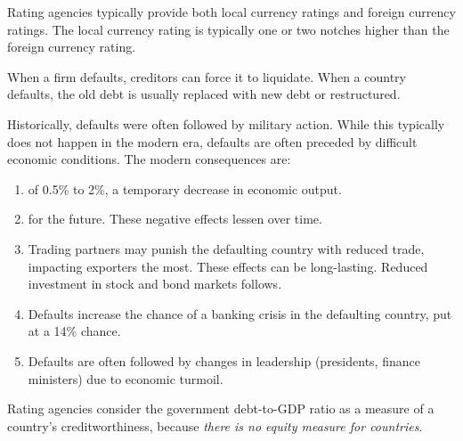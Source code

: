Rating agencies typically provide both local currency ratings and foreign
currency ratings. The local currency rating is typically one or two notches
higher than the foreign currency rating.


When a firm defaults, creditors can force it to liquidate. When a country
defaults, the old debt is usually replaced with new debt or restructured.

Historically, defaults were often followed by military action. While this
typically does not happen in the modern era, defaults are often preceded by
difficult economic conditions. The modern consequences are:

\begin{enumerate}
\item {} of 0.5\% to 2\%, a temporary decrease in
economic output.
\item {} for the future.
These negative effects lessen over time.
\item {} Trading partners may punish the defaulting
country with reduced trade, impacting exporters the most. These effects can be
long-lasting. Reduced investment in stock and bond markets follows.
\item {} Defaults increase the chance of a banking
crisis in the defaulting country, put at a 14\% chance.
\item {} Defaults are often followed by changes in
leadership (presidents, finance ministers) due to economic turmoil.
\end{enumerate}


Rating agencies consider the government debt-to-GDP ratio as a measure of a
country's creditworthiness, because \emph{there is no equity measure for
countries}.

